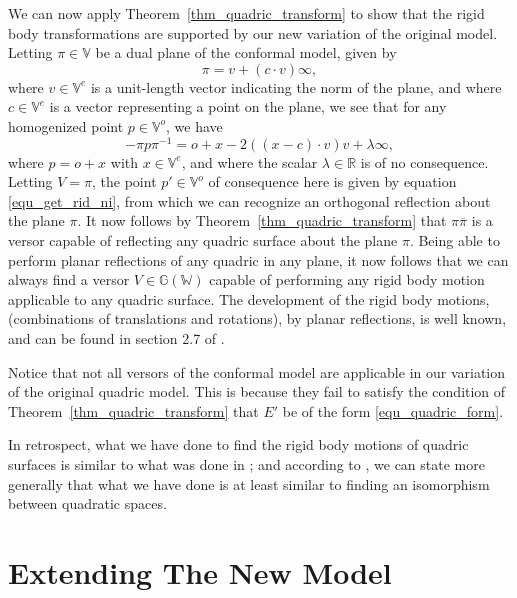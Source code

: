 \documentclass{birkjour}
\theoremstyle{definition}
\theoremstyle{remark}
\numberwithin{equation}{section}
\newcommand{\G}{\mathbb{G}}
\newcommand{\V}{\mathbb{V}}
\newcommand{\W}{\mathbb{W}}
\newcommand{\R}{\mathbb{R}}
\newcommand{\nvao}{o}
\newcommand{\nvai}{\infty}
\begin{document}
We can now apply Theorem~\ref{thm_quadric_transform} to show
that the rigid body transformations are supported by our new variation of the original model.
Letting $\pi\in\V$ be a dual plane of the conformal model, given by
\begin{equation}
\pi = v+(c\cdot v)\nvai,
\end{equation}
where $v\in\V^e$ is a unit-length vector indicating the norm of the plane,
and where $c\in\V^e$ is a vector representing a point on the plane,
we see that for any homogenized point $p\in\V^o$, we have
\begin{equation}
-\pi p\pi^{-1} = \nvao+x-2((x-c)\cdot v)v + \lambda\nvai,
\end{equation}
where $p=\nvao+x$ with $x\in\V^e$, and
where the scalar $\lambda\in\R$ is of no consequence.  Letting $V=\pi$,
the point $p'\in\V^o$ of consequence here is given by equation \eqref{equ_get_rid_ni},
from which we can recognize an orthogonal reflection about the plane $\pi$.
It now follows by Theorem~\ref{thm_quadric_transform} that $\pi\overline{\pi}$ is a versor
capable of reflecting any quadric surface about the plane $\pi$.
Being able to perform planar reflections of any quadric in any plane, it
now follows that we can always find a versor $V\in\G(\W)$ capable of performing
any rigid body motion applicable to any quadric surface.  The development
of the rigid body motions, (combinations of translations and rotations), by planar reflections,
is well known, and can be found in section 2.7 of \cite{LiRockwood}.

Notice that not all versors of the conformal model are applicable in
our variation of the original quadric model.  This is because they fail to
satisfy the condition of Theorem~\ref{thm_quadric_transform} that $E'$ be
of the form \eqref{equ_quadric_form}.

In retrospect, what we have done to find the rigid body motions
of quadric surfaces is similar to what was done in \cite{Langer08}; and
according to \cite{Pfister95}, we can state more generally that what we
have done is at least similar to finding an isomorphism between quadratic spaces.

\section{Extending The New Model}
\end{document}
